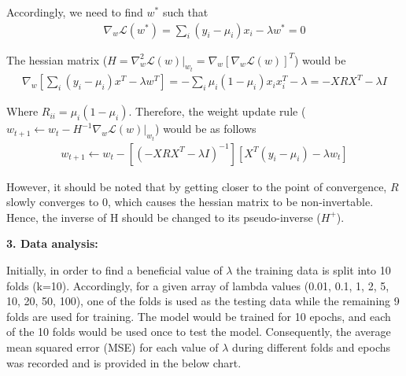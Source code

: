 \documentclass[12pt,a4paper]{article}
\begin{document}
	\vspace{-0.2cm}
	\noindent Accordingly, we need to find $w^*$ such that 
	\begin{align}
	\nabla_w\mathcal{L}(w^*) = \sum_{i}(y_i-\mu_i)x_i - \lambda w^*=0
	\end{align}
	
	\vspace{-0.2cm}
	\noindent The hessian matrix ($	H = \nabla^2_w\mathcal{L}(w)|_{w_t} = \nabla_w[\nabla_w\mathcal{L}(w)]^T$) would be
	\begin{align}
		\nabla_w[\sum_{i}(y_i-\mu_i)x^T - \lambda w^T]= -\sum_i\mu_i(1-\mu_i)x_ix^T_i  - \lambda = -XRX^T - \lambda I
	\end{align}
	
	\vspace{-0.2cm}
	\noindent Where $R_{ii}= \mu_i(1-\mu_i)$. Therefore, the weight update rule ($w_{t+1} \leftarrow w_t - H^{-1}\nabla_w\mathcal{L}(w)|_{w_t}$) would be as follows
	\begin{align}
		w_{t+1}\leftarrow w_t - [(-XRX^T - \lambda I)^{-1}][X^T(y_i-\mu_i) - \lambda w_t]
	\end{align}
	
	\vspace{-0.2cm}
	\noindent However, it should be noted that by getting closer to the point of convergence, $R$ slowly converges to 0, which causes the hessian matrix to be non-invertable. Hence, the inverse of H should be changed to its pseudo-inverse ($H^+$).
	
	\newpage
	\noindent \textbf{3. Data analysis:}
	\vspace{0.2cm}
	
	\noindent Initially, in order to find a beneficial value of $\lambda$ the training data is split into 10 folds (k=10). Accordingly, for a given array of lambda values ({0.01, 0.1, 1, 2, 5, 10, 20, 50, 100}), one of the folds is used as the testing data while the remaining 9 folds are used for training. The model would be trained for 10 epochs, and each of the 10 folds would be used once to test the model. Consequently, the average mean squared error (MSE) for each value of $\lambda$ during different folds and epochs was recorded and is provided in the below chart.
	
\end{document}
